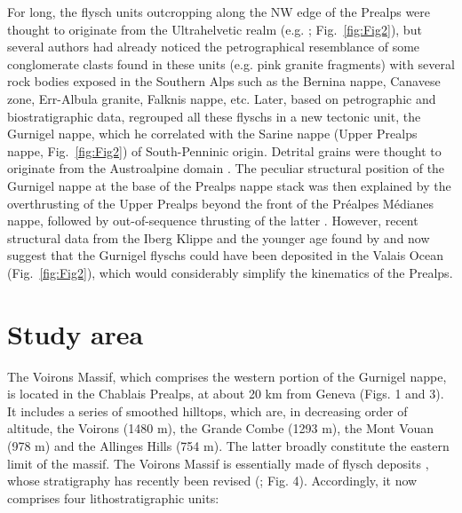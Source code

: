 \documentclass[twoside]{article}
\begin{document}
For long, the flysch units outcropping along the NW edge of the Prealps were thought to originate from the Ultrahelvetic realm (e.g. \citealp{Tercier1928a,Lombard1940a}; Fig.~\ref{fig:Fig2}), but several authors had already noticed the petrographical resemblance of some conglomerate clasts found in these units (e.g. pink granite fragments) with several rock bodies exposed in the Southern Alps \citep{Sarasin1894b,Pilloud1936,Lombard1940a,Cogulu1961} such as the Bernina nappe, Canavese zone, Err-Albula granite, Falknis nappe, etc. Later, based on petrographic and biostratigraphic data, \cite{Caron1976} regrouped all these flyschs in a new tectonic unit, the Gurnigel nappe, which he correlated with the Sarine nappe (Upper Prealps nappe, Fig.~\ref{fig:Fig2}) of South-Penninic origin. Detrital grains were thought to originate from the Austroalpine domain \citep{Winkler1983,Caron1989}. The peculiar structural position of the Gurnigel nappe at the base of the Prealps nappe stack was then explained by the overthrusting of the Upper Prealps beyond the front of the Préalpes Médianes nappe, followed by out-of-sequence thrusting of the latter \citep{Mosar1991,Wissing2002}. However, recent structural data from the Iberg Klippe \citep{Trumpy2006} and the younger age found by \cite{Ujetz1996} and \cite{Ospina-Ostios2013} now suggest that the Gurnigel flyschs could have been deposited in the Valais Ocean (Fig.~\ref{fig:Fig2}), which would considerably simplify the kinematics of the Prealps.\par

\section{Study area}

The Voirons Massif, which comprises the western portion of the Gurnigel nappe, is located in the Chablais Prealps, at about 20 km from Geneva (Figs. 1 and 3). It includes a series of smoothed hilltops, which are, in decreasing order of altitude, the Voirons (1480 m), the Grande Combe (1293 m), the Mont Vouan (978 m) and the Allinges Hills (754 m). The latter broadly constitute the eastern limit of the massif. The Voirons Massif is essentially made of flysch deposits \citep{Lombard1940a,JanduChene1975c,Stuijvenberg1980a}, whose stratigraphy has recently been revised (\citealp{Ragusa2015}; Fig. 4). Accordingly, it now comprises four lithostratigraphic units:

\end{document}
